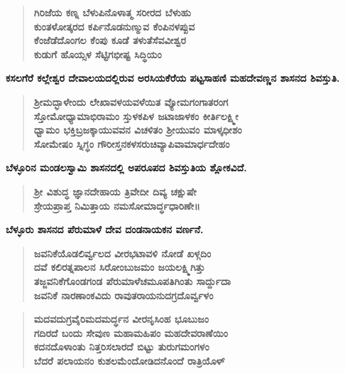 \begin{verse}
\textbf{ಗಿರಿಜೆಯ ಕಣ್ನ ಬೆಳುಪಿನೊಳಾತ್ಮ ಸರೀರದ ಬೆಳುಹು \\ ಕುಂತಳೋತ್ಕರದ ಕರ್ಪಿನೊಡನುಣ್ಮುವ ಕೆಂಪಿನಳಪ್ಪುವ \\ ಕೆಂಜೆಡೆದೊಂಗಲ ಕೆಂಪು ಕೂಡೆ ತಳುತೆಸೆವವೀಶ್ವರ \\ ಕುಡುಗೆ ಹೊಯ್ಸಳ ಸೆಟ್ಟಿಗಭೀಷ್ಟ ಸಿದ್ಧಿಯಂ}
\end{verse}

\noindent
\textbf{ಕಸಲಗೆರೆ ಕಲ್ಲೇಶ್ವರ ದೇವಾಲಯದಲ್ಲಿರುವ ಅರಸಿಯಕೆರೆಯ ಪಟ್ಟಸಾಹಣಿ ಮಹದೇವಣ್ಣನ ಶಾಸನದ ಶಿವಸ್ತುತಿ.}

\begin{verse}
\textbf{ಶ‍್ರೀಮದ್ಭಾಳೇಂದು ಲೇಖಾವಳಯವಳೆಯಿತ ವ್ಯೋಮಗಂಗಾತರಂಗ \\ ಸ್ತೋಮೋಧ್ಯಾಮಾಭಿರಾಮಂ ಸ್ತುಳಕಪಿಳ ಜಟಾಜಾಳಕಂ ಕೀರ್ತಿಲಕ್ಷ್ಮೀ \\ ಧ್ವಾಮಂ ಭಕ್ತಿಬ್ರಜಕ್ಕಾಯುವವನ ವಿಚಳಿತಂ ಶ‍್ರೀಯುವಂ ಮಾಳ್ಕಧೀಶಂ\\ ಸೋಮೇಷಂ ಸ್ನಿಗ್ಧಂ ಗೌರೀಸ್ತನಕಳಸರುಚಿವ್ಯಾಪಿವಾಮಾರ್ಧದೇಹಂ}
\end{verse}

\noindent
\textbf{ಬೆಳ್ಳೂರಿನ ಮಂಡಲಸ್ವಾಮಿ ಶಾಸನದಲ್ಲಿ ಅಪರೂಪದ ಶಿವಸ್ತುತಿಯ ಶ್ಲೋಕವಿದೆ.}

\begin{verse}
\textbf{ಶ‍್ರೀ ವಿಶುದ್ಧ ಜ್ಞಾನದೇಹಾಯ ತ್ರಿವೇದೀ ದಿವ್ಯ ಚಕ್ಷುಷೇ\\ ಸ್ರೇಯಪ್ರಾಪ್ತ ನಿಮಿತ್ತಾಯ ನಮಸೋಮಾರ್ದ್ಧಧಾರಿಣೇ॥}
\end{verse}

\newpage

\noindent
\textbf{ಬೆಳ್ಳೂರು ಶಾಸನದ ಪೆರುಮಾಳೆ ದೇವ ದಂಡನಾಯಕನ ವರ್ಣನೆ.}

\begin{verse}
\textbf{ಜವನಿಕೆಯೊಡಲಿರ್ವ್ವಲದ ವೀರಭಟಾವಳಿ ನೋಡೆ ಖಳ್ಗದಿಂ\\ ದವೆ ಕಲಿರತ್ನಪಾಲನ ಸಿರೋಂಬುಜಮಂ ಜಯಲಕ್ಷ್ಮಿಗಿತ್ತು \\ ತಜ್ಜವನಿಕೆಗೊಂಡಗಂಡ ಪೆರುಮಾಳೆಚಮೂಪತಿಗಿಂತು ಸಾರ್ದ್ದುದಾ \\ ಜವನಿಕೆ ನಾರಣಾಂಕವಿದು ರಾವುತರಾಯನುದಗ್ರದೊರ್ವ್ವಳಂ}
\end{verse}

\begin{verse}
\textbf{ಮದವದುಗ್ರವೈರಿಮದಮರ್ದ್ಧನ ವೀರನೃಸಿಂಹ ಭೂಬುಜಂ \\ ಗದಿರದೆ ಬಂದು ಸೇವುಣ ಮಹಾಮಹಿಪಂ ಮಹದೇವರಾಣೆಯಿಂ \\ ಕದನದೊಳಾಂತು ನಿತ್ತರಿಸಲಾರದೆ ಬಿಟ್ಟು ತುರುಗಮಂಗಳಂ \\ ಬೆದರೆ ಪಲಾಯನಂ ಕುಶಲಮೆಂದೋಡಿದನೊಂದೆ ರಾತ್ರಿಯೊಳ್​}
\end{verse}

